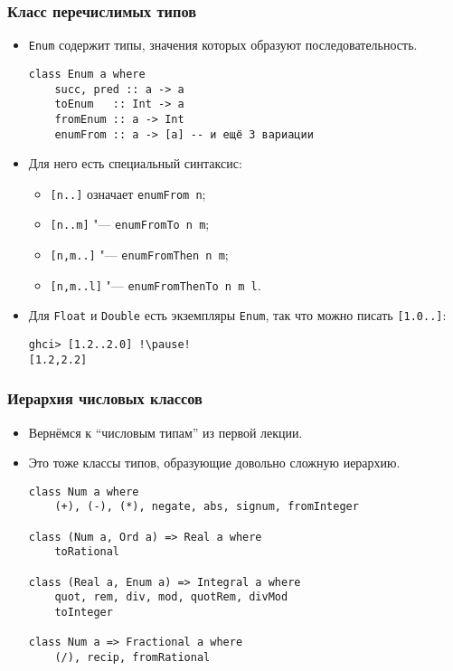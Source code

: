 \documentclass[10pt]{beamer}
\begin{document}
\begin{frame}[fragile]
  \frametitle{Класс перечислимых типов}
  \begin{itemize}
    \item
          \lstinline|Enum| содержит типы, значения которых образуют последовательность.
          \begin{lstlisting}
class Enum a where
    succ, pred :: a -> a
    toEnum   :: Int -> a
    fromEnum :: a -> Int
    enumFrom :: a -> [a] -- и ещё 3 вариации
\end{lstlisting}
          \pause
    \item Для него есть специальный синтаксис:
          \begin{itemize}
            \item \lstinline|[n..]| означает \lstinline|enumFrom n|;
            \item \lstinline|[n..m]| "--- \lstinline|enumFromTo n m|;
            \item \lstinline|[n,m..]| "--- \lstinline|enumFromThen n m|;
            \item \lstinline|[n,m..l]| "--- \lstinline|enumFromThenTo n m l|.
          \end{itemize}
          \pause
    \item Для \lstinline|Float| и \lstinline|Double| есть экземпляры \lstinline|Enum|, так что можно писать \lstinline|[1.0..]|:
          \begin{lstlisting}
ghci> [1.2..2.0] !\pause!
[1.2,2.2]
\end{lstlisting}
  \end{itemize}
\end{frame}

\begin{frame}[fragile]
  \frametitle{Иерархия числовых классов}
  \begin{itemize}
    \item Вернёмся к \enquote{числовым типам} из первой лекции.
    \item Это тоже классы типов, образующие довольно сложную иерархию.\pause
          \begin{lstlisting}
class Num a where
    (+), (-), (*), negate, abs, signum, fromInteger

class (Num a, Ord a) => Real a where
    toRational
    
class (Real a, Enum a) => Integral a where
    quot, rem, div, mod, quotRem, divMod
    toInteger
    
class Num a => Fractional a where
    (/), recip, fromRational    
\end{lstlisting}

  \end{itemize}
\end{frame}
\end{document}
